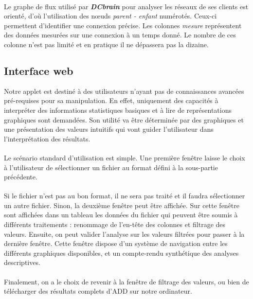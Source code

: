 		\paragraph{} Le graphe de flux utilisé par \textbf{\textit{DCbrain}} pour analyser les réseaux de ses clients est orienté, d'où l'utilisation des nœuds \textit{parent - enfant} numérotés. Ceux-ci permettent d'identifier une connexion précise. Les colonnes \textit{mesure} représentent des données mesurées sur une connexion à un temps donné. Le nombre de ces colonne n'est pas limité et en pratique il ne dépassera pas la dizaine.

	\subsection{Interface web}
		Notre applet est destiné à des utilisateurs n'ayant pas de connaissances avancées pré-requises pour sa manipulation. En effet, uniquement des capacités à interpréter des informations statistiques basiques et à lire de représentations graphiques sont demandées. Son utilité va être déterminée par des graphiques et une présentation des valeurs intuitifs qui vont guider l'utilisateur dans l'interprétation des résultats.
		
		\paragraph{}Le scénario standard d'utilisation est simple. Une première fenêtre laisse le choix à l'utilisateur de sélectionner un fichier au format défini à la sous-partie précédente.
		\paragraph{}Si le fichier n'est pas au bon format, il ne sera pas traité et il faudra sélectionner un autre fichier. Sinon, la deuxième fenêtre peut être affichée.  Sur cette fenêtre sont affichées dans un tableau les données du fichier qui peuvent être soumis à différents traitements : renommage de l'en-tête des colonnes et filtrage des valeurs. Ensuite, on peut valider l'analyse sur les valeurs filtrées pour passer à la dernière fenêtre. Cette fenêtre dispose d'un système de navigation entre les différents graphiques disponibles, et un compte-rendu synthétique des analyses descriptives.
		\paragraph{}Finalement, on a le choix de revenir à la fenêtre de filtrage des valeurs, ou bien de télécharger des résultats complets d'ADD sur notre ordinateur.
		
